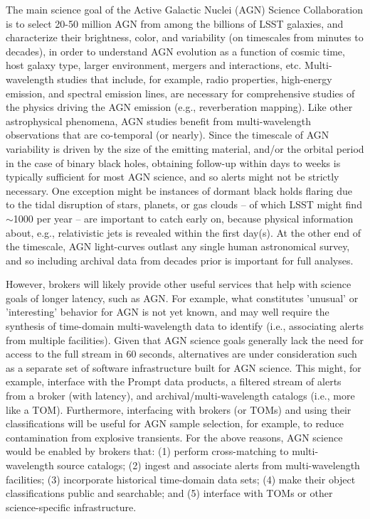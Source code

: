 The main science goal of the Active Galactic Nuclei (AGN) Science Collaboration is to select 20-50 million AGN from among the billions of LSST galaxies, and characterize their brightness, color, and variability (on timescales from minutes to decades), in order to understand AGN evolution as a function of cosmic time, host galaxy type, larger environment, mergers and interactions, etc. Multi-wavelength studies that include, for example, radio properties, high-energy emission, and spectral emission lines, are necessary for comprehensive studies of the physics driving the AGN emission (e.g., reverberation mapping). Like other astrophysical phenomena, AGN studies benefit from multi-wavelength observations that are co-temporal (or nearly). Since the timescale of AGN variability is driven by the size of the emitting material, and/or the orbital period in the case of binary black holes, obtaining follow-up within days to weeks is typically sufficient for most AGN science, and so alerts might not be strictly necessary. One exception might be instances of dormant black holds flaring due to the tidal disruption of stars, planets, or gas clouds -- of which LSST might find $\sim$1000 per year -- are important to catch early on, because physical information about, e.g., relativistic jets is revealed within the first day(s). At the other end of the timescale, AGN light-curves outlast any single human astronomical survey, and so including archival data from decades prior is important for full analyses. 

However, brokers will likely provide other useful services that help with science goals of longer latency, such as AGN. For example, what constitutes 'unusual' or 'interesting' behavior for AGN is not yet known, and may well require the synthesis of time-domain multi-wavelength data to identify (i.e., associating alerts from multiple facilities). Given that AGN science goals generally lack the need for access to the full stream in $60$ seconds, alternatives are under consideration such as a separate set of software infrastructure built for AGN science. This might, for example, interface with the Prompt data products, a filtered stream of alerts from a broker (with latency), and archival/multi-wavelength catalogs (i.e., more like a TOM). Furthermore, interfacing with brokers (or TOMs) and using their classifications will be useful for AGN sample selection, for example, to reduce contamination from explosive transients. For the above reasons, AGN science would be enabled by brokers that:
(1) perform cross-matching to multi-wavelength source catalogs; 
(2) ingest and associate alerts from multi-wavelength facilities; 
(3) incorporate historical time-domain data sets; 
(4) make their object classifications public and searchable; and 
(5) interface with TOMs or other science-specific infrastructure.

